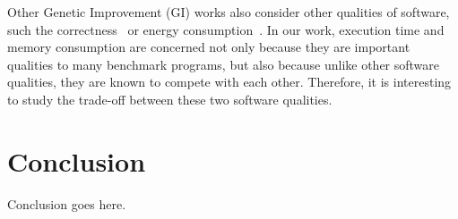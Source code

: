 \documentclass[oribibl]{llncs}
\begin{document}
Other Genetic Improvement (GI) works also consider other qualities of software, such the correctness~\cite{6035728} or energy consumption~\cite{Bruce:2015:REC:2739480.2754752}.
In our work, execution time and memory consumption are concerned not only because they are important qualities to many benchmark programs, but also because unlike other software qualities, they are known to compete with each other.
Therefore, it is interesting to study the trade-off between these two software qualities.

\section{Conclusion}
\label{sec_conclusion}

Conclusion goes here.


   
\end{document}
